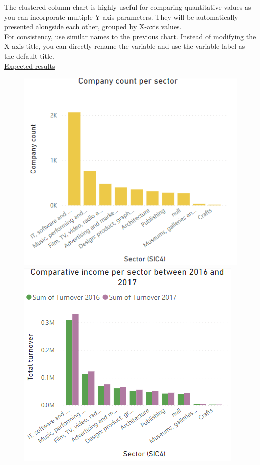 \documentclass[11pt]{article}
\begin{document}
The clustered column chart is highly useful for comparing quantitative values as you can incorporate multiple Y-axis parameters. They will be automatically presented alongside each other, grouped by X-axis values.\\

For consistency, use similar names to the previous chart. Instead of modifying the X-axis title, you can directly rename the variable and use the variable label as the default title.\\

\underline{Expected results}

\begin{figure}[h!]
    \centering
    \begin{minipage}{.5\textwidth}
      \centering
      \includegraphics[width=.8\linewidth]{img/companyPerSector.png}
    \end{minipage}%
    \begin{minipage}{.5\textwidth}
      \centering
      \includegraphics[width=.8\linewidth]{img/totalTurnover.png}
    \end{minipage}
\end{figure}
\end{document}
